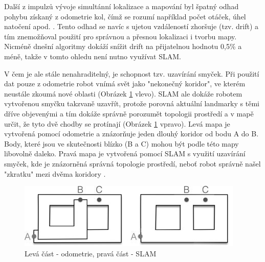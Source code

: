 \documentclass[12pt,a4paper]{report}
\begin{document}
Další z impulzů vývoje simultánní lokalizace a mapování byl špatný odhad pohybu získaný z odometrie kol, čímž se rozumí například počet otáček, úhel natočení apod. \cite{Past_Present_and_Future_of_Simultaneous_Localization_And_Mapping}. Tento odhad se navíc s ujetou vzdáleností zhoršuje (tzv. drift) a tím znemožňoval použití pro správnou a přesnou lokalizaci i tvorbu mapy. Nicméně dnešní algoritmy dokáží snížit drift na přijatelnou hodnotu 0,5\% a méně, takže v tomto ohledu není nutno využívat SLAM. 

V čem je ale stále nenahraditelný, je schopnost tzv. uzavírání smyček. Při použití dat pouze z odometrie robot vnímá svět jako "nekonečný koridor", ve kterém neustále zkoumá nové oblasti (Obrázek \ref{1} vlevo). SLAM ale dokáže robotem vytvořenou smyčku takzvaně uzavřít, protože porovná aktuální landmarky s těmi dříve objevenými a tím dokáže správně porozumět topologii prostředí a v mapě určit, že tyto dvě chodby se protínají (Obrázek \ref{1} vpravo). Levá mapa je vytvořená pomocí odometrie a znázorňuje jeden dlouhý koridor od bodu A do B. Body, které jsou ve skutečnosti blízko (B a C) mohou být podle této mapy libovolně daleko. Pravá mapa je vytvořená pomocí SLAM s využití uzavírání smyček, kde je znázorněná správná topologie prostředí, neboť robot správně našel "zkratku" mezi dvěma koridory \cite{Past_Present_and_Future_of_Simultaneous_Localization_And_Mapping}.

\begin{figure}[H]
\centering
\includegraphics[scale=1]{img/Obr1_b}
\caption{Levá část - odometrie, pravá část - SLAM} 
\label{1}
\end{figure}
\end{document}

